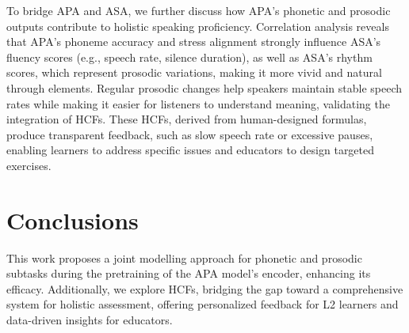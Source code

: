 \documentclass[conference,a4paper]{APSIPA2025}
\begin{document}
To bridge APA and ASA, we further discuss how APA’s phonetic and prosodic outputs contribute to holistic speaking proficiency. Correlation analysis reveals that APA’s phoneme accuracy and stress alignment strongly influence ASA’s fluency scores (e.g., speech rate, silence duration), as well as ASA's rhythm scores, which represent 
prosodic variations, making it more vivid and natural through elements. Regular prosodic changes help speakers maintain stable speech rates while making it easier for listeners to understand meaning, validating the integration of HCFs. These HCFs, derived from human-designed formulas, produce transparent feedback, such as slow speech rate or excessive pauses, enabling learners to address specific issues and educators to design targeted exercises. 

\section*{Conclusions}

This work proposes a joint modelling approach for phonetic and prosodic subtasks during the pretraining of the APA model's encoder, enhancing its efficacy. Additionally, we explore HCFs, bridging the gap toward a comprehensive system for holistic assessment, offering personalized feedback for L2 learners and data-driven insights for educators.





\end{document}
